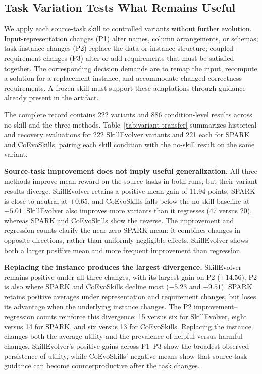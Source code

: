 \subsection{Task Variation Tests What Remains Useful}
\label{sec:variant-transfer}

We apply each source-task skill to controlled variants without further evolution. Input-representation changes (P1) alter names, column arrangements, or schemas; task-instance changes (P2) replace the data or instance structure; coupled-requirement changes (P3) alter or add requirements that must be satisfied together. The corresponding decision demands are to remap the input, recompute a solution for a replacement instance, and accommodate changed correctness requirements. A frozen skill must support these adaptations through guidance already present in the artifact.

The complete record contains 222 variants and 886 condition-level results across no skill and the three methods. Table~\ref{tab:variant-transfer} summarizes historical and recovery evaluations for 222 SkillEvolver variants and 221 each for SPARK and CoEvoSkills, pairing each skill condition with the no-skill result on the same variant.

\noindent\textbf{Source-task improvement does not imply useful generalization.}
All three methods improve mean reward on the source tasks in both runs, but their variant results diverge. SkillEvolver retains a positive mean gain of 11.94 points, SPARK is close to neutral at $+0.65$, and CoEvoSkills falls below the no-skill baseline at $-5.01$. SkillEvolver also improves more variants than it regresses (47 versus 20), whereas SPARK and CoEvoSkills show the reverse. The improvement and regression counts clarify the near-zero SPARK mean: it combines changes in opposite directions, rather than uniformly negligible effects. SkillEvolver shows both a larger positive mean and more frequent improvement than regression.

\noindent\textbf{Replacing the instance produces the largest divergence.}
SkillEvolver remains positive under all three changes, with its largest gain on P2 ($+14.56$). P2 is also where SPARK and CoEvoSkills decline most ($-5.23$ and $-9.51$). SPARK retains positive averages under representation and requirement changes, but loses its advantage when the underlying instance changes. The P2 improvement--regression counts reinforce this divergence: 15 versus six for SkillEvolver, eight versus 14 for SPARK, and six versus 13 for CoEvoSkills. Replacing the instance changes both the average utility and the prevalence of helpful versus harmful changes. SkillEvolver's positive gains across P1--P3 show the broadest observed persistence of utility, while CoEvoSkills' negative means show that source-task guidance can become counterproductive after the task changes.


